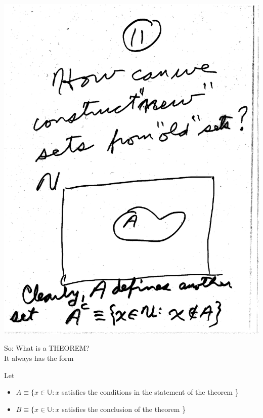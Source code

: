 \documentclass[10pt,a4paper]{article}
\begin{document}
\includegraphics[scale=.5]{Pages/ST_11}

\newpage

\noindent So: What is a THEOREM?
\vspace{2mm}
\\ \noindent It always has the form 

\begin{center}
\end{center}

\vspace{2mm}
\noindent Let
\begin{itemize}
\item $A \equiv \{ x \in \mathbb{U}: x $ satisfies the conditions in the statement of the theorem \}
\item $B \equiv \{ x \in \mathbb{U}: x $ satisfies the conclusion of the theorem \}
\end{itemize}
\end{document}
